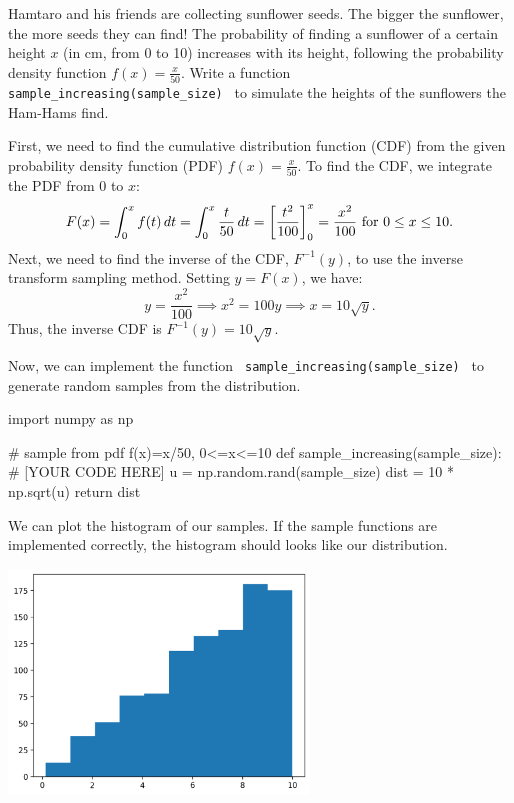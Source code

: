\documentclass[a4paper, 10pt]{article}
\begin{document}
\begin{tosubmit}
Hamtaro and his friends are collecting sunflower seeds. The bigger the sunflower, the more seeds they can find!
The probability of finding a sunflower of a certain height \( x \) (in cm, from 0 to 10) increases with its height, following the probability density function \( f(x)= \frac{x}{50} \).
Write a function \texttt{ sample\_increasing(sample\_size) } to simulate the heights of the sunflowers the Ham-Hams find.

\vspace{5mm}

\par\noindent\submitsolution
First, we need to find the cumulative distribution function (CDF) from the given probability density function (PDF) \( f(x) = \frac{x}{50} \).
To find the CDF, we integrate the PDF from 0 to \( x \):
\[
    F(x) = \int_0^x f(t) \, dt = \int_0^x \frac{t}{50} \, dt = \left[ \frac{t^2}{100} \right]_0^x = \frac{x^2}{100} \text{ for } 0 \leq x \leq 10.
\]
Next, we need to find the inverse of the CDF, \( F^{-1}(y) \), to use the inverse transform sampling method.
Setting \( y = F(x) \), we have:
\[
    y = \frac{x^2}{100} \implies x^2 = 100y \implies x = 10\sqrt{y}.
\]
Thus, the inverse CDF is \( F^{-1}(y) = 10\sqrt{y} \).

Now, we can implement the function \texttt{ sample\_increasing(sample\_size) } to generate random samples from the distribution.
\begin{codingbox}
import numpy as np

# sample from pdf f(x)=x/50, 0<=x<=10
def sample_increasing(sample_size):
  # [YOUR CODE HERE]
  u = np.random.rand(sample_size)
  dist = 10 * np.sqrt(u)
  return dist
\end{codingbox}

We can plot the histogram of our samples.
If the sample functions are implemented correctly, the histogram should looks like our distribution.
\begin{center}
    \includegraphics[width=0.6\textwidth]{images/sampling_increasing.png}
\end{center}
\end{tosubmit}
\end{document}
